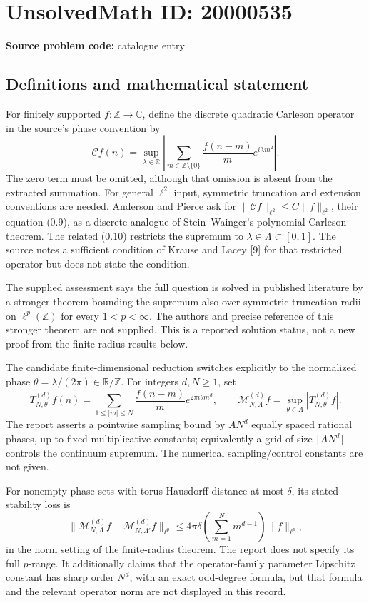 \documentclass[11pt]{article}
\newcommand{\Z}{\mathbb{Z}}
\newcommand{\R}{\mathbb{R}}
\newcommand{\C}{\mathbb{C}}
\begin{document}
\section*{UnsolvedMath ID: 20000535}
\textbf{Source problem code:} catalogue entry
\subsection{Definitions and mathematical statement}
For finitely supported \(f:\Z\to\C\), define the discrete quadratic Carleson operator in the source's phase convention by
\[
 \mathcal C f(n)=\sup_{\lambda\in\R}
 \left|\sum_{m\in\Z\setminus\{0\}}\frac{f(n-m)}m e^{i\lambda m^2}\right|.
\]
The zero term must be omitted, although that omission is absent from the extracted summation. For general \(\ell^2\) input, symmetric truncation and extension conventions are needed. Anderson and Pierce ask for \(\|\mathcal C f\|_{\ell^2}\le C\|f\|_{\ell^2}\), their equation (0.9), as a discrete analogue of Stein--Wainger's polynomial Carleson theorem. The related (0.10) restricts the supremum to \(\lambda\in\Lambda\subset[0,1]\). The source notes a sufficient condition of Krause and Lacey [9] for that restricted operator but does not state the condition.

The supplied assessment says the full question is solved in published literature by a stronger theorem bounding the supremum also over symmetric truncation radii on \(\ell^p(\Z)\) for every \(1<p<\infty\). The authors and precise reference of this stronger theorem are not supplied. This is a reported solution status, not a new proof from the finite-radius results below.

The candidate finite-dimensional reduction switches explicitly to the normalized phase \(\theta=\lambda/(2\pi)\in\R/\Z\). For integers \(d,N\ge1\), set
\[
 T_{N,\theta}^{(d)}f(n)=\sum_{1\le|m|\le N}\frac{f(n-m)}m e^{2\pi i\theta m^d},
 \qquad \mathcal M_{N,\Lambda}^{(d)}f=\sup_{\theta\in\Lambda}|T_{N,\theta}^{(d)}f|.
\]
The report asserts a pointwise sampling bound by \(AN^d\) equally spaced rational phases, up to fixed multiplicative constants; equivalently a grid of size \(\lceil AN^d\rceil\) controls the continuum supremum. The numerical sampling/control constants are not given.

For nonempty phase sets with torus Hausdorff distance at most \(\delta\), its stated stability loss is
\[
 \|\mathcal M_{N,\Lambda}^{(d)}f-\mathcal M_{N,\Lambda'}^{(d)}f\|_{\ell^p}
 \le4\pi\delta\left(\sum_{m=1}^Nm^{d-1}\right)\|f\|_{\ell^p},
\]
in the norm setting of the finite-radius theorem. The report does not specify its full \(p\)-range. It additionally claims that the operator-family parameter Lipschitz constant has sharp order \(N^d\), with an exact odd-degree formula, but that formula and the relevant operator norm are not displayed in this record.
\end{document}
